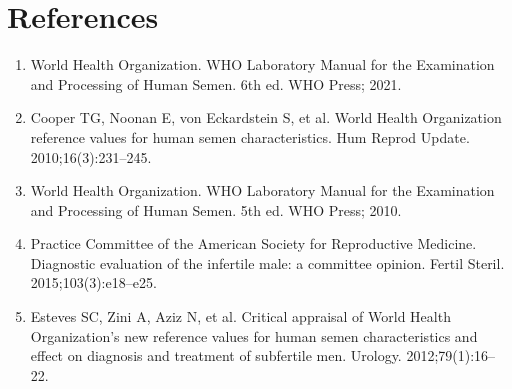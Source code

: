 \section*{References}
\begin{enumerate}
  \item World Health Organization. WHO Laboratory Manual for the Examination and Processing of Human Semen. 6th ed. WHO Press; 2021.
  \item Cooper TG, Noonan E, von Eckardstein S, et al. World Health Organization reference values for human semen characteristics. Hum Reprod Update. 2010;16(3):231--245.
  \item World Health Organization. WHO Laboratory Manual for the Examination and Processing of Human Semen. 5th ed. WHO Press; 2010.
  \item Practice Committee of the American Society for Reproductive Medicine. Diagnostic evaluation of the infertile male: a committee opinion. Fertil Steril. 2015;103(3):e18--e25.
  \item Esteves SC, Zini A, Aziz N, et al. Critical appraisal of World Health Organization's new reference values for human semen characteristics and effect on diagnosis and treatment of subfertile men. Urology. 2012;79(1):16--22.
\end{enumerate}
\clearpage
